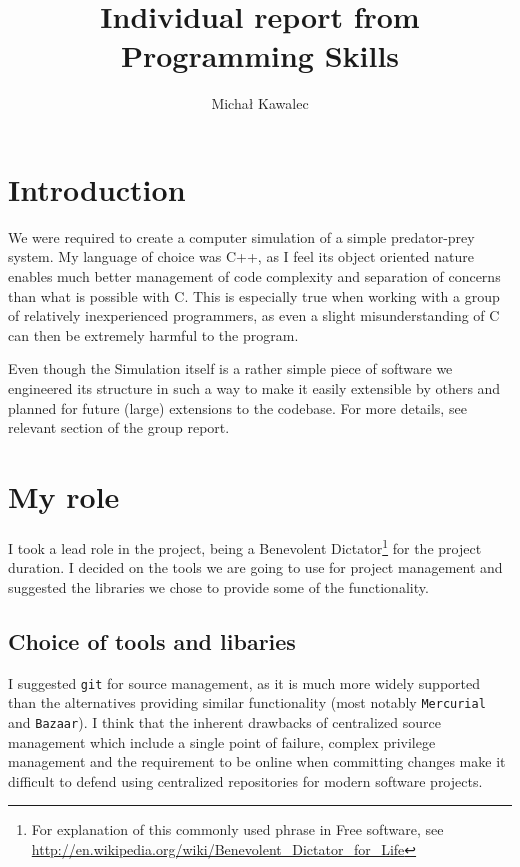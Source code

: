 \documentclass[11pt,a4paper]{article}
\begin{document}
\title{Individual report from Programming Skills}
\author{Michał Kawalec}
\maketitle

\section{Introduction}
We were required to create a computer simulation of a simple predator-prey system.
My language of choice was C++, as I feel its object oriented nature enables much better management of code complexity and separation of concerns than what is possible with C. This is especially true when working with a group of relatively inexperienced programmers, as even a slight misunderstanding of C can then be extremely harmful to the program.

Even though the Simulation itself is a rather simple piece of software we engineered its structure in such a way to make it easily extensible by others and planned for future (large) extensions to the codebase. For more details, see relevant section of the group report.

\section{My role}

I took a lead role in the project, being a Benevolent Dictator\footnote{For explanation of this commonly used phrase in Free software, see \url{http://en.wikipedia.org/wiki/Benevolent_Dictator_for_Life}} for the project duration. I decided on the tools we are going to use for project management and suggested the libraries we chose to provide some of the functionality.

\subsection{Choice of tools and libaries}

I suggested \texttt{git} for source management, as it is much more widely supported than the alternatives providing similar functionality (most notably \texttt{Mercurial} and \texttt{Bazaar}). I think that the inherent drawbacks of centralized source management which include a single point of failure, complex privilege management and the requirement to be online when committing changes make it difficult to defend using centralized repositories for modern software projects. 
\end{document}
